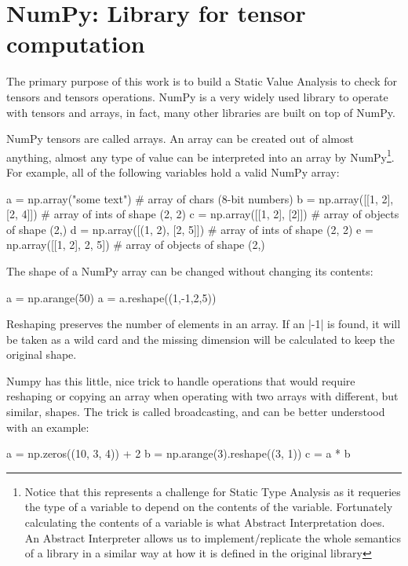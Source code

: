 \section{NumPy: Library for tensor computation}
\label{numpy-library-for-tensor-computation}

The primary purpose of this work is to build a Static Value Analysis to
check for tensors and tensors operations. NumPy
\autocite{oliphant2006guide} is a very widely used library to operate
with tensors and arrays, in fact, many other libraries are built on top
of NumPy.

NumPy tensors are called arrays. An array can be created out of almost
anything, almost any type of value can be interpreted into an array by
NumPy\footnote{Notice that this represents a challenge for Static Type
  Analysis as it requeries the type of a variable to depend on the
  contents of the variable. Fortunately calculating the contents of a
  variable is what Abstract Interpretation does. An Abstract Interpreter
  allows us to implement/replicate the whole semantics of a library in a
  similar way at how it is defined in the original library}. For
example, all of the following variables hold a valid NumPy array:

\begin{pythoncode}
a = np.array("some text")       # array of chars (8-bit numbers)
b = np.array([[1, 2], [2, 4]])  # array of ints of shape (2, 2)
c = np.array([[1, 2], [2]])     # array of objects of shape (2,)
d = np.array([(1, 2), [2, 5]])  # array of ints of shape (2, 2)
e = np.array([[1, 2], {2, 5}])     # array of objects of shape (2,)
\end{pythoncode}

The shape of a NumPy array can be changed without changing its contents:

\begin{pythoncode}
a = np.arange(50)
a = a.reshape((1,-1,2,5))
\end{pythoncode}

Reshaping preserves the number of elements in an array. If an
\pycode|-1| is found, it will be taken as a wild card and the missing
dimension will be calculated to keep the original shape.

Numpy has this little, nice trick to handle operations that would
require reshaping or copying an array when operating with two arrays
with different, but similar, shapes. The trick is called broadcasting,
and can be better understood with an example:

\begin{pythoncode}
a = np.zeros((10, 3, 4)) + 2
b = np.arange(3).reshape((3, 1))
c = a * b
\end{pythoncode}

